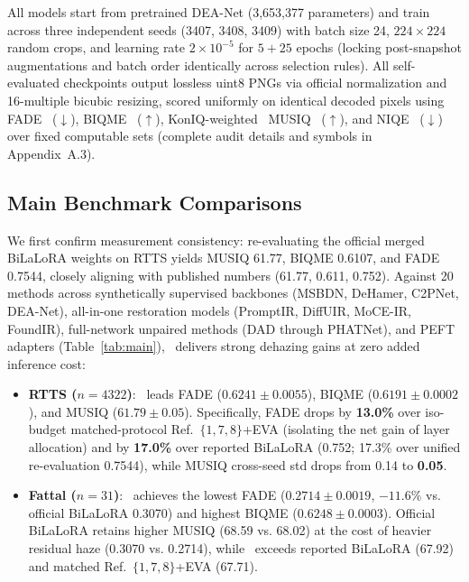 \documentclass[10pt,twocolumn,letterpaper]{article}
\begin{document}
All models start from pretrained DEA-Net (3,653,377 parameters) and train across three independent seeds (3407, 3408, 3409) with batch size 24, $224\times 224$ random crops, and learning rate $2\times 10^{-5}$ for $5+25$ epochs (locking post-snapshot augmentations and batch order identically across selection rules). All self-evaluated checkpoints output lossless uint8 PNGs via official normalization and 16-multiple bicubic resizing, scored uniformly on identical decoded pixels using FADE~\cite{fade2015} ($\downarrow$), BIQME~\cite{biqme2018} ($\uparrow$), KonIQ-weighted~\cite{koniq2020} MUSIQ~\cite{musiq2021} ($\uparrow$), and NIQE~\cite{niqe2013} ($\downarrow$) over fixed computable sets (complete audit details and symbols in Appendix~A.3).

\subsection{Main Benchmark Comparisons}
\begin{table}[t]
\centering\small\setlength{\tabcolsep}{2.5pt}

\caption{Quantitative comparison across all 20 methods on RTTS ($n=4322$) and Fattal ($n=31$). $\dagger$ denotes results quoted from~\cite{bilalora2026}; self-evaluated rows run under unified lossless uint8 PNG decoding, with the bottom two rows reporting 3-seed mean$\pm$std.  and  indicate best and second-best per column. Extended tables with Entropy, 2,000-bootstrap 95\% CIs, and $n=30$ screening appear in Appendix~B.}
\label{tab:main}
\end{table}

We first confirm measurement consistency: re-evaluating the official merged BiLaLoRA weights on RTTS yields MUSIQ 61.77, BIQME 0.6107, and FADE 0.7544, closely aligning with published numbers (61.77, 0.611, 0.752). Against 20 methods across synthetically supervised backbones (MSBDN, DeHamer, C2PNet, DEA-Net), all-in-one restoration models (PromptIR, DiffUIR, MoCE-IR, FoundIR), full-network unpaired methods (DAD through PHATNet), and PEFT adapters (Table~\ref{tab:main}), \method~delivers strong dehazing gains at zero added inference cost:
\begin{itemize}\setlength{\itemsep}{1pt}\setlength{\parskip}{0pt}
\item \textbf{RTTS ($n=4322$)}: \method~leads FADE ($0.6241\pm 0.0055$), BIQME ($0.6191\pm 0.0002$), and MUSIQ ($61.79\pm 0.05$). Specifically, FADE drops by \textbf{13.0\%} over iso-budget matched-protocol Ref.~\(\{1,7,8\}\)+EVA (isolating the net gain of layer allocation) and by \textbf{17.0\%} over reported BiLaLoRA (0.752; 17.3\% over unified re-evaluation 0.7544), while MUSIQ cross-seed std drops from 0.14 to \textbf{0.05}.
\item \textbf{Fattal ($n=31$)}: \method~achieves the lowest FADE ($0.2714\pm 0.0019$, $-11.6\%$ vs. official BiLaLoRA 0.3070) and highest BIQME ($0.6248\pm 0.0003$). Official BiLaLoRA retains higher MUSIQ (68.59 vs. 68.02) at the cost of heavier residual haze (0.3070 vs. 0.2714), while \method~exceeds reported BiLaLoRA (67.92) and matched Ref.~\(\{1,7,8\}\)+EVA (67.71).
\end{itemize}
\end{document}
